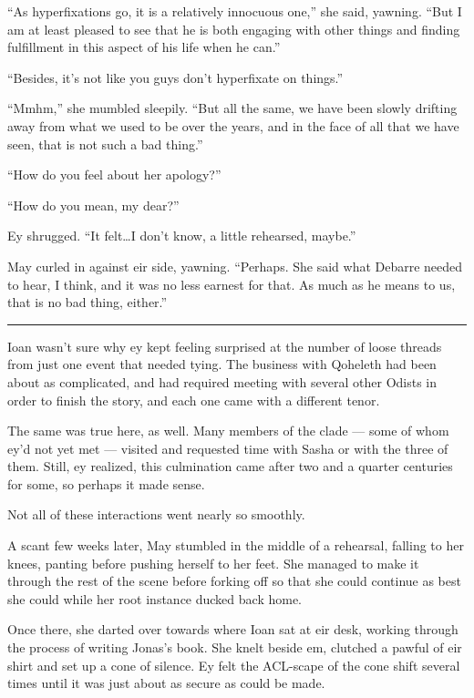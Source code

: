 ``As hyperfixations go, it is a relatively innocuous one,'' she said, yawning. ``But I am at least pleased to see that he is both engaging with other things and finding fulfillment in this aspect of his life when he can.''

``Besides, it's not like you guys don't hyperfixate on things.''

``Mmhm,'' she mumbled sleepily. ``But all the same, we have been slowly drifting away from what we used to be over the years, and in the face of all that we have seen, that is not such a bad thing.''

``How do you feel about her apology?''

``How do you mean, my dear?''

Ey shrugged. ``It felt\ldots I don't know, a little rehearsed, maybe.''

May curled in against eir side, yawning. ``Perhaps. She said what Debarre needed to hear, I think, and it was no less earnest for that. As much as he means to us, that is no bad thing, either.''

\begin{center}\rule{0.5\linewidth}{0.5pt}\end{center}

Ioan wasn't sure why ey kept feeling surprised at the number of loose threads from just one event that needed tying. The business with Qoheleth had been about as complicated, and had required meeting with several other Odists in order to finish the story, and each one came with a different tenor.

The same was true here, as well. Many members of the clade — some of whom ey'd not yet met — visited and requested time with Sasha or with the three of them. Still, ey realized, this culmination came after two and a quarter centuries for some, so perhaps it made sense.

Not all of these interactions went nearly so smoothly.

A scant few weeks later, May stumbled in the middle of a rehearsal, falling to her knees, panting before pushing herself to her feet. She managed to make it through the rest of the scene before forking off so that she could continue as best she could while her root instance ducked back home.

Once there, she darted over towards where Ioan sat at eir desk, working through the process of writing Jonas's book. She knelt beside em, clutched a pawful of eir shirt and set up a cone of silence. Ey felt the ACL-scape of the cone shift several times until it was just about as secure as could be made.

